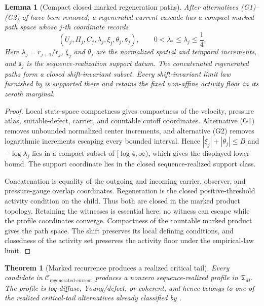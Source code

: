 \documentclass[11pt]{amsart}
\numberwithin{equation}{section}
\theoremstyle{plain}
\newtheorem{theorem}{Theorem}[section]
\newtheorem{lemma}[lemma]{Lemma}
\theoremstyle{definition}
\theoremstyle{remark}
\newcommand{\Cregen}{\mathcal C_{\mathrm{regenerated\text{-}current}}}
\newcommand{\Tcrit}{\mathfrak T_M}
\begin{document}
\begin{lemma}[Compact closed marked regeneration paths]
\label{lem:compact-closed-marked-regeneration-paths}
After alternatives \textup{(G1)}--\textup{(G2)} of
 have been removed, a regenerated-current
cascade has a compact marked path space whose \(j\)-th coordinate records
\[
 (U_j,\Pi_j,C_j,\lambda_j,\xi_j,\theta_j,\mathfrak s_j),
 \qquad 0<\lambda_*\le\lambda_j\le\frac14.
\]
Here \(\lambda_j=r_{j+1}/r_j\), \(\xi_j\) and \(\theta_j\) are the normalized
spatial and temporal increments, and \(\mathfrak s_j\) is the
sequence-realization support datum.  The concatenated regenerated paths form
a closed shift-invariant subset.  Every shift-invariant limit law furnished by
 is supported there and retains
the fixed non-affine activity floor in its zeroth marginal.
\end{lemma}

\begin{proof}
Local state-space compactness gives compactness of the velocity, pressure
atlas, suitable-defect, carrier, and countable cutoff coordinates.
Alternative \textup{(G1)} removes unbounded normalized center increments, and
alternative \textup{(G2)} removes logarithmic increments escaping every
bounded interval.  Hence \(|\xi_j|+|\theta_j|\le B\) and
\(-\log\lambda_j\) lies in a compact subset of
\([\log4,\infty)\), which gives the displayed lower bound.  The support
coordinate lies in the closed sequence-realized support class.

Concatenation is equality of the outgoing and incoming carrier, observer, and
pressure-gauge overlap coordinates.  Regeneration is the closed
positive-threshold activity condition on the child.  Thus both are closed in
the marked product topology.  Retaining the witnesses is essential here: no
witness can escape while the profile coordinates converge.  Compactness of
the countable marked product gives the path space.  The shift preserves its
local defining conditions, and closedness of the activity set preserves the
activity floor under the empirical-law limit.
\end{proof}

\begin{theorem}[Marked recurrence produces a realized critical tail]
\label{thm:marked-regeneration-to-critical-tail}
Every candidate in \(\Cregen\) produces a nonzero sequence-realized profile in
\(\Tcrit\).  The profile is log-diffuse, Young/defect, or coherent, and hence
belongs to one of the realized critical-tail alternatives already classified
by .
\end{theorem}
\end{document}

